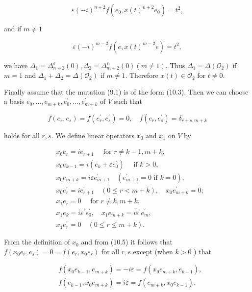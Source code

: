 \documentclass[10pt]{article}
\begin{document}
$$
\varepsilon(-i)^{n+2} f\left(e_{0}, x(t)^{n+2} e_{0}\right)=t^{2},
$$

and if $m \neq 1$

$$
\varepsilon(-i)^{m-2} f\left(e, x(t)^{m-2} e\right)=t^{2},
$$

we have $\Delta_{1}=\Delta_{n+2}^{\varepsilon}(0), \Delta_{2}=\Delta_{m-2}^{\varepsilon}(0)(m \neq 1)$. Thus $\Delta_{1}=\Delta\left(\mathcal{O}_{2}\right)$ if $m=1$ and $\Delta_{1}+\Delta_{2}=\Delta\left(\mathcal{O}_{2}\right)$ if $m \neq 1$. Therefore $x(t) \in \mathcal{O}_{2}$ for $t \neq 0$.

Finally assume that the mutation (9.1) is of the form (10.3). Then we can choose a basis $e_{0}, \ldots, e_{m+k}, e_{0}^{\prime}, \ldots, e_{m+k}^{\prime}$ of $V$ such that


\begin{equation*}
f\left(e_{r}, e_{s}\right)=f\left(e_{r}^{\prime}, e_{s}^{\prime}\right)=0, \quad f\left(e_{r}, e_{s}^{\prime}\right)=\delta_{r+s, m+k} \tag{10.5}
\end{equation*}


holds for all $r, s$. We define linear operators $x_{0}$ and $x_{1}$ on $V$ by

$$
\begin{aligned}
& x_{0} e_{r}=i e_{r+1} \quad \text { for } r \neq k-1, m+k, \\
& x_{0} e_{k-1}=i\left(e_{k}+\varepsilon e_{0}^{\prime}\right) \quad \text { if } k>0, \\
& x_{0} e_{m+k}=i \varepsilon e_{m+1}^{\prime} \quad\left(e_{m+1}^{\prime}=0 \text { if } k=0\right), \\
& x_{0} e_{r}^{\prime}=i e_{r+1}^{\prime} \quad(0 \leqslant r<m+k), \quad x_{0} e_{m+k}^{\prime}=0 ; \\
& x_{1} e_{r}=0 \quad \text { for } r \neq k, m+k, \\
& x_{1} e_{k}=i \varepsilon^{\prime} e_{0}^{\prime}, \quad x_{1} e_{m+k}=i \varepsilon^{\prime} e_{m}^{\prime}, \\
& x_{1} e_{r}^{\prime}=0 \quad(0 \leqslant r \leqslant m+k) .
\end{aligned}
$$

From the definition of $x_{0}$ and from (10.5) it follows that $f\left(x_{0} e_{r}, e_{s}\right)=0=f\left(e_{r}, x_{0} e_{s}\right)$ for all $r, s$ except (when $k>0$ ) that

$$
\begin{aligned}
& f\left(x_{0} e_{k-1}, e_{m+k}\right)=-i \varepsilon=f\left(x_{0} e_{m+k}, e_{k-1}\right), \\
& f\left(e_{k-1}, x_{0} e_{m+k}\right)=i \varepsilon=f\left(e_{m+k}, x_{0} e_{k-1}\right) .
\end{aligned}
$$
\end{document}
